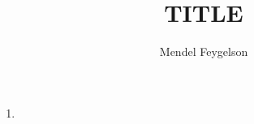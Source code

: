 \documentclass{article}
\title{TITLE}
\author{Mendel Feygelson}
\begin{document}
\maketitle
\begin{enumerate}

   \item <++>

\end{enumerate}
\end{document}
